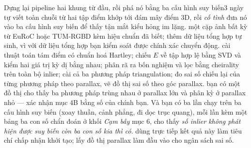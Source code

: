 \documentclass[../../vslam.tex]{subfiles}
\begin{document}
\begin{duan}{Dựng lại pipeline hai khung từ đầu, rồi phá nó bằng ba cấu hình suy biến}{3 ngày}
\dmt tự viết toàn chuỗi từ hai tập điểm khớp tới đám mây điểm \(3\)D, rồi \emph{cố tình} đưa nó vào ba cấu hình suy biến để thấy tận mắt kiểu hỏng im lặng.
\ddl một cặp ảnh bất kỳ từ EuRoC hoặc TUM-RGBD kèm hiệu chuẩn đã biết; thêm dữ liệu tổng hợp tự sinh, vì với dữ liệu tổng hợp bạn kiểm soát được chính xác chuyển động.
\dbc cài thuật toán tám điểm có chuẩn hoá Hartley; chiếu \(E\) về tập hợp lệ bằng SVD và kiểm hai giá trị kỳ dị bằng nhau; phân rã ra bốn nghiệm và lọc bằng cheirality trên toàn bộ inlier; cài cả ba phương pháp triangulation; đo sai số chiếu lại của từng phương pháp theo parallax, vẽ đồ thị sai số theo góc parallax.
\dxk bạn có một đồ thị cho thấy ba phương pháp trùng nhau ở parallax lớn và phân kỳ ở parallax nhỏ --- xác nhận mục 4B bằng số của chính bạn. Và bạn có ba lần chạy trên ba cấu hình suy biến (xoay thuần, cảnh phẳng, đi dọc trục quang), mỗi lần kèm một bảng ba con số chẩn đoán ở khối \emph{Cạm bẫy} mục 6, cho thấy \emph{số inlier không phát hiện được suy biến còn ba con số kia thì có}.
\dnv {} dùng trực tiếp kết quả này làm tiêu chí chấp nhận khởi tạo;  lấy đồ thị parallax làm đầu vào cho ngân sách sai số.
\end{duan}
\end{document}
